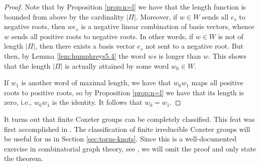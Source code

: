 \documentclass{article}
\theoremstyle{definition}
\begin{document}
\begin{proof}
Note that by Proposition \ref{prop:n=l} we have that the length function is bounded from above by the cardinality $|\Pi|$. Moreover, if $w \in W$ sends all $e_s$ to negative roots, then $we_s$ is a negative linear combination of basis vectors, whence $w$ sends all positive roots to negative roots. In other words, if $w \in W$ is not of length $|\Pi|$, then there exists a basis vector $e_s$ not sent to a negative root. But then, by Lemma \ref{lem:humphreys5.4} the word $ws$ is longer than $w$. This shows that the length $|\Pi|$ is actually attained by some word $w_0 \in W$.

If $w_1$ is another word of maximal length, we have that $w_0w_1$ maps all positive roots to positive roots, so by Proposition \ref{prop:n=l} we have that its length is zero, i.e., $w_0w_1$ is the identity. It follows that $w_0 = w_1$.
\end{proof}

It turns out that finite Coxeter groups can be completely classified. This feat was first accomplished in \cite{coxeter1935}. The classification of finite irreducible Coxeter groups will be useful for us in Section \ref{sec:torus-knots}. Since this is a well-documented exercise in combinatorial graph theory, see \cite{humphreys1990}, we will omit the proof and only state the theorem.
\end{document}
